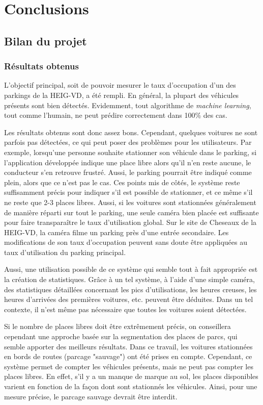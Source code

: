 \chapter{Conclusions}
\section{Bilan du projet}

\subsection{Résultats obtenus} \label{conclusion.projet.resultats}
L'objectif principal, soit de pouvoir mesurer le taux d'occupation d'un des parkings de la HEIG-VD, a été rempli. En général, la plupart des véhicules présents sont bien détectés. Evidemment, tout algorithme de \textit{machine learning}, tout comme l'humain, ne peut prédire correctement dans 100\% des cas. 

Les résultats obtenus sont donc assez bons. Cependant, quelques voitures ne sont parfois pas détectées, ce qui peut poser des problèmes pour les utilisateurs. Par exemple, lorsqu'une personne souhaite stationner son véhicule dans le parking, si l'application développée indique une place libre alors qu'il n'en reste aucune, le conducteur s'en retrouve frustré. Aussi, le parking pourrait être indiqué comme plein, alors que ce n'est pas le cas. Ces points mis de côtés, le système reste suffisamment précis pour indiquer s'il est possible de stationner, et ce même s'il ne reste que 2-3 places libres. Aussi, si les voitures sont stationnées généralement de manière réparti sur tout le parking, une seule caméra bien placée est suffisante pour faire transparaître le taux d'utilisation global. Sur le site de Cheseaux de la HEIG-VD, la caméra filme un parking près d'une entrée secondaire. Les modifications de son taux d'occupation peuvent sans doute être appliquées au taux d'utilisation du parking principal. 

Aussi, une utilisation possible de ce système qui semble tout à fait appropriée est la création de statistiques. Grâce à un tel système, à l'aide d'une simple caméra, des statistiques détaillées concernant les pics d'utilisations, les heures creuses, les heures d'arrivées des premières voitures, etc. peuvent être déduites. Dans un tel contexte, il n'est même pas nécessaire que toutes les voitures soient détectées. 

Si le nombre de places libres doit être extrêmement précis, on conseillera cependant une approche basée sur la segmentation des places de parcs, qui semble apporter des meilleurs résultats. Dans ce travail, les voitures stationnées en bords de routes (parcage "sauvage") ont été prises en compte. Cependant, ce système permet de compter les véhicules présents, mais ne peut pas compter les places libres. En effet, s'il y a un manque de marque au sol, les places disponibles varient en fonction de la façon dont sont stationnés les véhicules. Ainsi, pour une mesure précise, le parcage sauvage devrait être interdit.

